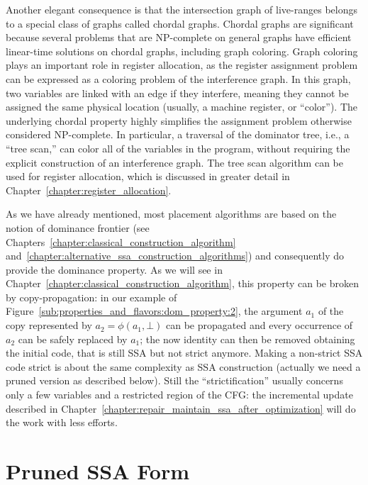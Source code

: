 Another elegant consequence is that the intersection graph of live-ranges belongs to a special class of
graphs called chordal graphs. Chordal graphs are significant because several
problems that are NP-complete on general graphs have efficient linear-time
solutions on chordal graphs, including graph coloring. Graph coloring plays
an important role in register allocation, as the register assignment problem can be expressed as a coloring problem of the interference graph.
In this graph, two variables are linked with an edge if they interfere, meaning they cannot be assigned the same physical location (usually, a machine register, or ``color'').
The underlying chordal property highly simplifies the assignment problem otherwise considered NP-complete. In particular,
a traversal of the dominator tree, i.e., a ``tree scan,'' can color all of
the variables in the program, without requiring the explicit construction
of an interference graph. The tree scan algorithm can be used
for register allocation, which is discussed
in greater detail in Chapter~\ref{chapter:register_allocation}. 

As we have already mentioned, most \phifun placement algorithms are based on the notion of dominance frontier (see Chapters~\ref{chapter:classical_construction_algorithm} and~\ref{chapter:alternative_ssa_construction_algorithms}) and consequently do provide the dominance property. As we will see in Chapter~\ref{chapter:classical_construction_algorithm}, this property can be broken by copy-propagation: in our example of Figure~\ref{sub:properties_and_flavors:dom_property:2}, the argument $a_1$ of the copy represented by $a_2=\phi(a_1,\bot)$ can be propagated and every occurrence of $a_2$ can be safely replaced by $a_1$; the now identity \phifun can then be removed obtaining the initial code, that is still SSA but not strict anymore. Making a non-strict SSA code strict is about the same complexity as SSA construction (actually we need a pruned version as described below). Still the ``strictification'' usually concerns only a few variables and a restricted region of the CFG: the incremental update described in Chapter~\ref{chapter:repair_maintain_ssa_after_optimization} will do the work with less efforts.

\section{Pruned SSA Form}
\label{sec-prop-pruned}

